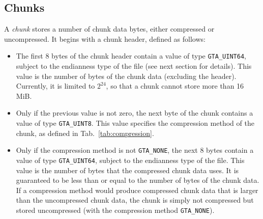\documentclass[a4paper,11pt]{article}
\newcommand{\code}[1]{\texttt{#1}}
\begin{document}
\subsection{Chunks}

A \emph{chunk} stores a number of chunk data bytes, either compressed or uncompressed.
It begins with a chunk header, defined as follows:
\begin{itemize}
\item The first 8 bytes of the chunk header contain a value of type \code{GTA\_UINT64},
subject to the endianness type of the file (see next section for details).
This value is the number of bytes of the chunk data (excluding the
header). Currently, it is limited to $2^{24}$, so that a chunk cannot store more
than 16 MiB.
\item Only if the previous value is not zero, the next byte of the chunk
contains a value of type \code{GTA\_UINT8}.  This value specifies the
compression method of the chunk, as defined in Tab.~\ref{tab:compression}.
\item Only if the compression method is not \code{GTA\_NONE}, the next 8 bytes
contain a value of type \code{GTA\_UINT64}, subject to the endianness type of
the file. This value is the number of bytes that the compressed chunk data
uses. It is guaranteed to be less than or equal to the number of bytes of the
chunk data. If a compression method would produce compressed chunk data that
is larger than the uncompressed chunk data, the chunk is simply not compressed
but stored uncompressed (with the compression method \code{GTA\_NONE}).
\end{itemize}
\end{document}
